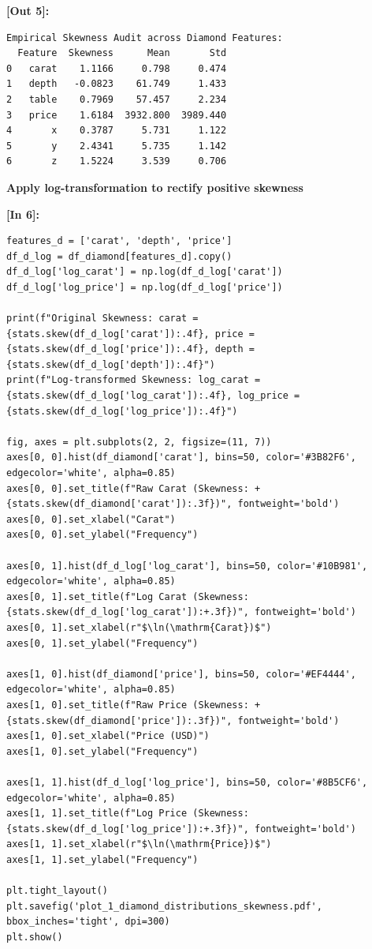 \vspace{0.2em}
\noindent\textbf{\small [Out 5]:}
\begin{lstlisting}[style=output]
Empirical Skewness Audit across Diamond Features:
  Feature  Skewness      Mean       Std
0   carat    1.1166     0.798     0.474
1   depth   -0.0823    61.749     1.433
2   table    0.7969    57.457     2.234
3   price    1.6184  3932.800  3989.440
4       x    0.3787     5.731     1.122
5       y    2.4341     5.735     1.142
6       z    1.5224     3.539     0.706
\end{lstlisting}
\vspace{0.3em}
\begin{tcolorbox}[colback=gray!5!white,colframe=gray!50!black,boxrule=0.5pt,arc=2pt,left=5pt,right=5pt,top=2pt,bottom=2pt,unbreakable,before upper={\sloppy\raggedright}]
{\small\bfseries Apply log-transformation to rectify positive skewness\par}
\end{tcolorbox}
\vspace{0.2em}
\vspace{0.4em}
\noindent\textbf{\small [In 6]:}
\begin{lstlisting}[style=pycode]
features_d = ['carat', 'depth', 'price']
df_d_log = df_diamond[features_d].copy()
df_d_log['log_carat'] = np.log(df_d_log['carat'])
df_d_log['log_price'] = np.log(df_d_log['price'])

print(f"Original Skewness: carat = {stats.skew(df_d_log['carat']):.4f}, price = {stats.skew(df_d_log['price']):.4f}, depth = {stats.skew(df_d_log['depth']):.4f}")
print(f"Log-transformed Skewness: log_carat = {stats.skew(df_d_log['log_carat']):.4f}, log_price = {stats.skew(df_d_log['log_price']):.4f}")

fig, axes = plt.subplots(2, 2, figsize=(11, 7))
axes[0, 0].hist(df_diamond['carat'], bins=50, color='#3B82F6', edgecolor='white', alpha=0.85)
axes[0, 0].set_title(f"Raw Carat (Skewness: +{stats.skew(df_diamond['carat']):.3f})", fontweight='bold')
axes[0, 0].set_xlabel("Carat")
axes[0, 0].set_ylabel("Frequency")

axes[0, 1].hist(df_d_log['log_carat'], bins=50, color='#10B981', edgecolor='white', alpha=0.85)
axes[0, 1].set_title(f"Log Carat (Skewness: {stats.skew(df_d_log['log_carat']):+.3f})", fontweight='bold')
axes[0, 1].set_xlabel(r"$\ln(\mathrm{Carat})$")
axes[0, 1].set_ylabel("Frequency")

axes[1, 0].hist(df_diamond['price'], bins=50, color='#EF4444', edgecolor='white', alpha=0.85)
axes[1, 0].set_title(f"Raw Price (Skewness: +{stats.skew(df_diamond['price']):.3f})", fontweight='bold')
axes[1, 0].set_xlabel("Price (USD)")
axes[1, 0].set_ylabel("Frequency")

axes[1, 1].hist(df_d_log['log_price'], bins=50, color='#8B5CF6', edgecolor='white', alpha=0.85)
axes[1, 1].set_title(f"Log Price (Skewness: {stats.skew(df_d_log['log_price']):+.3f})", fontweight='bold')
axes[1, 1].set_xlabel(r"$\ln(\mathrm{Price})$")
axes[1, 1].set_ylabel("Frequency")

plt.tight_layout()
plt.savefig('plot_1_diamond_distributions_skewness.pdf', bbox_inches='tight', dpi=300)
plt.show()
\end{lstlisting}
